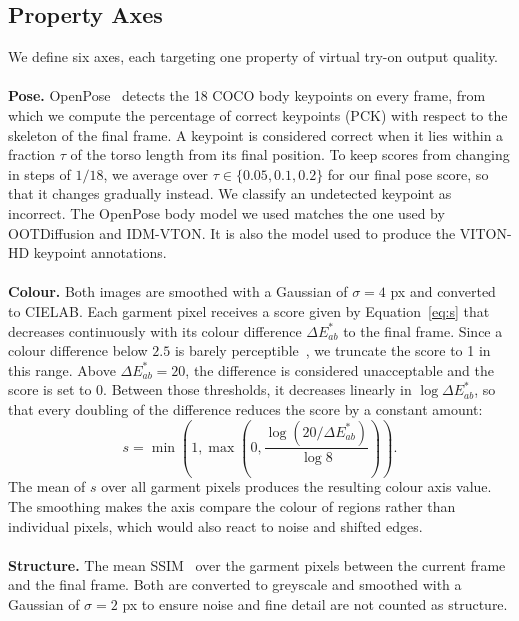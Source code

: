 \subsection{Property Axes}
\label{sec:axes}
We define six axes, each targeting one property of virtual try-on output quality. 
\\ \\
\textbf{Pose.} OpenPose~\cite{cao2019openpose} detects the 18 COCO body keypoints on every frame, from which we compute the percentage of correct keypoints (PCK) with respect to the skeleton of the final frame. A keypoint is considered correct when it lies within a fraction $\tau$ of the torso length from its final position. To keep scores from changing in steps of $1/18$, we average over $\tau \in \{0.05, 0.1, 0.2\}$ for our final pose score, so that it changes gradually instead. We classify an undetected keypoint as incorrect. The OpenPose body model we used matches the one used by OOTDiffusion and IDM-VTON. It is also the model used to produce the VITON-HD keypoint annotations.
\\ \\
\textbf{Colour.} Both images are smoothed with a Gaussian of $\sigma = 4$ px and converted to CIELAB. Each garment pixel receives a score given by Equation~\ref{eq:s} that decreases continuously with its colour difference $\Delta E^*_{ab}$ to the final frame. Since a colour difference below $2.5$ is barely perceptible~\cite{mahy1994evaluation}, we truncate the score to 1 in this range. Above $\Delta E^*_{ab} = 20$, the difference is considered unacceptable and the score is set to 0. Between those thresholds, it decreases linearly in $\log \Delta E^*_{ab}$, so that every doubling of the difference reduces the score by a constant amount:
\begin{equation}
  s = \min\!\left(1, \max\!\left(0, \frac{\log(20 / \Delta E^*_{ab})}{\log 8}\right)\right).
  \label{eq:s}
\end{equation}
The mean of $s$ over all garment pixels produces the resulting colour axis value. The smoothing makes the axis compare the colour of regions rather than individual pixels, which would also react to noise and shifted edges.
\\ \\
\textbf{Structure.} The mean SSIM~\cite{wang2004ssim} over the garment pixels between the current frame and the final frame. Both are converted to greyscale and smoothed with a Gaussian of $\sigma = 2$ px to ensure noise and fine detail are not counted as structure.
\\ \\

